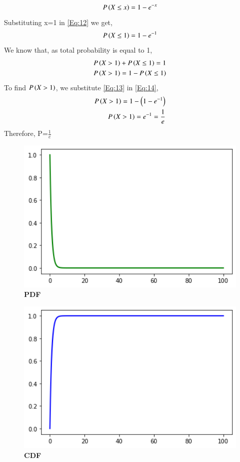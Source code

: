 \documentclass[journal,12pt,twocolumn]{IEEEtran}
\begin{document}
\begin{align}
P\left(X\leq x\right) = 1-e^{-x} \label{Eq:12}
\end{align}
Substituting x=1 in \eqref{Eq:12} we get,
\begin{align}
P\left(X\leq 1\right) = 1-e^{-1} \label{Eq:13}
\end{align}
We know that, as total probability is equal to 1,
\begin{align}
P\left(X>1\right)+P\left(X\leq1\right)=1 \\
P\left(X>1\right)=1-P\left(X\leq 1\right)\label{Eq:14}
\end{align}
To find $P\left(X>1\right)$, we substitute \eqref{Eq:13} in \eqref{Eq:14},
\begin{align}
P\left(X>1\right)=1-\left(1-e^{-1}\right) \\
P\left(X>1\right)=e^{-1}=\frac{1}{e} \label{Eq:15}
\end{align}
Therefore, P=$\frac{1}{e}$
\newpage
\begin{figure}
\includegraphics[width=15cm]{figure_1.png}
    \caption{\textbf{\huge{PDF}}} 
\end{figure}
\begin{figure}
\includegraphics[width=15cm]{figure_2.png}
    \caption{\textbf{\huge{CDF}}}
\end{figure}
\end{document}
